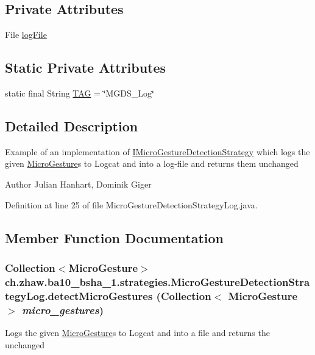 \subsection*{Private Attributes}
\begin{DoxyCompactItemize}
\item 
File \hyperlink{classch_1_1zhaw_1_1ba10__bsha__1_1_1strategies_1_1MicroGestureDetectionStrategyLog_a864950c0660460ae511b1b0e8e44bf62}{logFile}
\end{DoxyCompactItemize}
\subsection*{Static Private Attributes}
\begin{DoxyCompactItemize}
\item 
static final String \hyperlink{classch_1_1zhaw_1_1ba10__bsha__1_1_1strategies_1_1MicroGestureDetectionStrategyLog_aca8a670df7feba2931ca2ecc6e2f7802}{TAG} = \char`\"{}MGDS\_\-Log\char`\"{}
\end{DoxyCompactItemize}


\subsection{Detailed Description}
Example of an implementation of \hyperlink{interfacech_1_1zhaw_1_1ba10__bsha__1_1_1strategies_1_1IMicroGestureDetectionStrategy}{IMicroGestureDetectionStrategy} which logs the given \hyperlink{}{MicroGesture}s to Logcat and into a log-\/file and returns them unchanged

\begin{DoxyAuthor}{Author}
Julian Hanhart, Dominik Giger 
\end{DoxyAuthor}


Definition at line 25 of file MicroGestureDetectionStrategyLog.java.

\subsection{Member Function Documentation}
\hypertarget{classch_1_1zhaw_1_1ba10__bsha__1_1_1strategies_1_1MicroGestureDetectionStrategyLog_a52165ea7fe9595afa64e85b511c3ddbd}{
\subsubsection[{detectMicroGestures}]{\setlength{\rightskip}{0pt plus 5cm}Collection$<${\bf MicroGesture}$>$ ch.zhaw.ba10\_\-bsha\_\-1.strategies.MicroGestureDetectionStrategyLog.detectMicroGestures (Collection$<$ {\bf MicroGesture} $>$ {\em micro\_\-gestures})}}
\label{classch_1_1zhaw_1_1ba10__bsha__1_1_1strategies_1_1MicroGestureDetectionStrategyLog_a52165ea7fe9595afa64e85b511c3ddbd}
Logs the given \hyperlink{}{MicroGesture}s to Logcat and into a file and returns the unchanged


